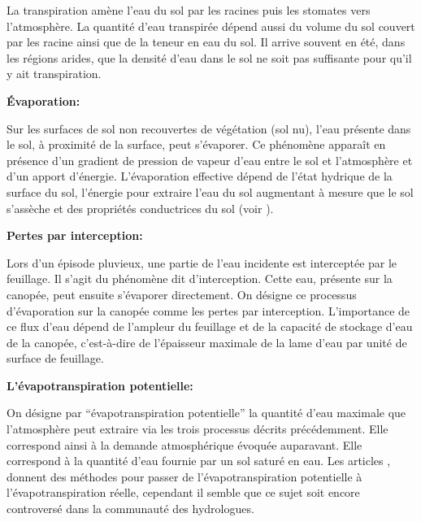 \documentclass[a4paper,11pt]{article}
\numberwithin{equation}{section}
\begin{document}
La transpiration amène l'eau du sol par les racines puis les stomates vers l'atmosphère. La quantité d'eau transpirée dépend aussi du volume du sol couvert par les racine ainsi que de la teneur en eau du sol. Il arrive souvent en été, dans les régions arides, que la densité d'eau dans le sol ne soit pas suffisante pour qu'il y ait transpiration.

\vspace{0.7cm}

\noindent\textbf{Évaporation:}

Sur les surfaces de sol non recouvertes de végétation (sol nu), l’eau présente dans le sol, à proximité de la surface, peut s’évaporer. Ce phénomène apparaît en présence d’un gradient de pression de vapeur d’eau entre le sol et l’atmosphère et d’un apport d’énergie. L’évaporation effective dépend de l’état hydrique de la surface du sol, l’énergie pour extraire l’eau du sol augmentant à mesure que le sol s’assèche et des propriétés conductrices du sol (voir \cite{hillel2003introduction}).

\vspace{0.7cm}

\noindent\textbf{Pertes par interception:}

Lors d’un épisode pluvieux, une partie de l’eau incidente est interceptée par le feuillage. Il s’agit du phénomène dit d’interception. Cette eau, présente sur la canopée, peut ensuite s’évaporer directement. On désigne ce processus d’évaporation sur la canopée comme les pertes par interception. L’importance de ce flux d’eau dépend de l’ampleur du feuillage et de la capacité de stockage d’eau de la canopée, c’est-à-dire de l’épaisseur maximale de la lame d’eau par unité de surface de feuillage.

\vspace{0.7cm}

\noindent\textbf{L'évapotranspiration potentielle:}

On désigne par  ``évapotranspiration potentielle'' la quantité d’eau maximale que l’atmosphère peut extraire via les trois processus décrits précédemment. Elle correspond ainsi à la demande atmosphérique évoquée auparavant. Elle correspond à la quantité d'eau fournie par un sol saturé en eau. Les articles \cite{kristensen1975model}, \cite{zhifang2010estimation} donnent des méthodes pour passer de l'évapotranspiration potentielle à l'évapotranspiration réelle, cependant il semble que ce sujet soit encore controversé dans la communauté des hydrologues.  
\end{document}
